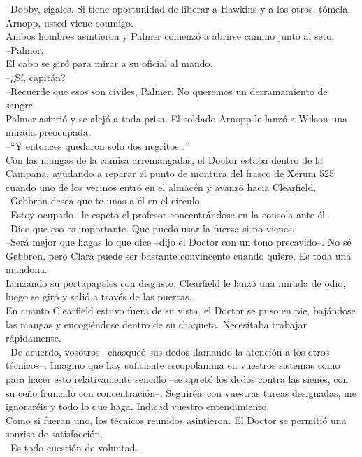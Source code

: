 --Dobby, sígales. Si tiene oportunidad de liberar a Hawkins y a los
otros, tómela. Arnopp, usted viene conmigo.\\
Ambos hombres asintieron y Palmer comenzó a abrirse camino junto al
seto.\\
--Palmer.\\
El cabo se giró para mirar a su oficial al mando.\\
--¿Sí, capitán?\\
--Recuerde que esos son civiles, Palmer. No queremos un derramamiento de
sangre.\\
Palmer asintió y se alejó a toda prisa. El soldado Arnopp le lanzó a
Wilson una mirada preocupada.\\
--``Y entonces quedaron solo dos negritos\ldots{}''\\[2\baselineskip]Con
las mangas de la camisa arremangadas, el Doctor estaba dentro de la
Campana, ayudando a reparar el punto de montura del frasco de Xerum 525
cuando uno de los vecinos entró en el almacén y avanzó hacia
Clearfield.\\
--Gebbron desea que te unas a él en el círculo.\\
--Estoy ocupado --le espetó el profesor concentrándose en la consola
ante él.\\
--Dice que eso es importante. Que puedo usar la fuerza si no vienes.\\
--Será mejor que hagas lo que dice --dijo el Doctor con un tono
precavido--. No sé Gebbron, pero Clara puede ser bastante convincente
cuando quiere. Es toda una mandona.\\
Lanzando su portapapeles con disgusto, Clearfield le lanzó una mirada de
odio, luego se giró y salió a través de las puertas.\\
En cuanto Clearfield estuvo fuera de su vista, el Doctor se puso en pie,
bajándose las mangas y encogiéndose dentro de su chaqueta. Necesitaba
trabajar rápidamente.\\
--De acuerdo, vosotros --chasqueó sus dedos llamando la atención a los
otros técnicos--. Imagino que hay suficiente escopolamina en vuestros
sistemas como para hacer esto relativamente sencillo --se apretó los
dedos contra las sienes, con su ceño fruncido con concentración--.
Seguiréis con vuestras tareas designadas, me ignoraréis y todo lo que
haga. Indicad vuestro entendimiento.\\
Como si fueran uno, los técnicos reunidos asintieron. El Doctor se
permitió una sonrisa de satisfacción.\\
--Es todo cuestión de voluntad\ldots{}\\
